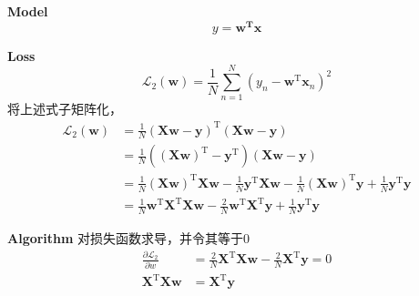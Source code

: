 \documentclass[UTF8]{ctexart}
\numberwithin{equation}{section}
\begin{document}
\textbf{Model}  
\begin{equation*}
    y=\boldsymbol{w^Tx}    
\end{equation*}

\textbf{Loss} 
\begin{equation*}
    \mathcal{L}_2(\boldsymbol{w})=\frac{1}{N} \sum_{n=1}^{N}\left(y_{n}-\boldsymbol{w}^{\mathrm{T}} \boldsymbol{x}_{n}\right)^{2}    
\end{equation*}
将上述式子矩阵化，
\begin{equation*}
    \begin{aligned}
		\mathcal{L}_2(\boldsymbol{w}) &=\frac{1}{N}(\boldsymbol{X} \boldsymbol{w}-\boldsymbol{y})^{\mathrm{T}}(\boldsymbol{X} \boldsymbol{w}-\boldsymbol{y}) \\
		&=\frac{1}{N}\left((\boldsymbol{X} \boldsymbol{w})^{\mathrm{T}}-\boldsymbol{y}^{\mathrm{T}}\right)(\boldsymbol{X} \boldsymbol{w}-\boldsymbol{y}) \\
		&=\frac{1}{N}(\boldsymbol{X} \boldsymbol{w})^{\mathrm{T}} \boldsymbol{X} \boldsymbol{w}-\frac{1}{N} \boldsymbol{y}^{\mathrm{T}} \boldsymbol{X} \boldsymbol{w}-\frac{1}{N}(\boldsymbol{X} \boldsymbol{w})^{\mathrm{T}} \boldsymbol{y}+\frac{1}{N} \boldsymbol{y}^{\mathrm{T}} \boldsymbol{y} \\
		&=\frac{1}{N} \boldsymbol{w}^{\mathrm{T}} \boldsymbol{X}^{\mathrm{T}} \boldsymbol{X} \boldsymbol{w}-\frac{2}{N} \boldsymbol{w}^{\mathrm{T}} \boldsymbol{X}^{\mathrm{T}} \boldsymbol{y}+\frac{1}{N} \boldsymbol{y}^{\mathrm{T}} \boldsymbol{y}
		\end{aligned}
\end{equation*}

\textbf{Algorithm} 对损失函数求导，并令其等于0
\begin{equation*}
    \begin{aligned}
		\frac{\partial \mathcal{L}_2}{\partial w} &=\frac{2}{N} \boldsymbol{X}^{\mathrm{T}} \boldsymbol{X} \boldsymbol{w}-\frac{2}{N} \boldsymbol{X}^{\mathrm{T}} \boldsymbol{y}=0 \\
		\boldsymbol{X}^{\mathrm{T}} \boldsymbol{X} \boldsymbol{w} &=\boldsymbol{X}^{\mathrm{T}} \boldsymbol{y}
		\end{aligned}
\end{equation*}
\end{document}
